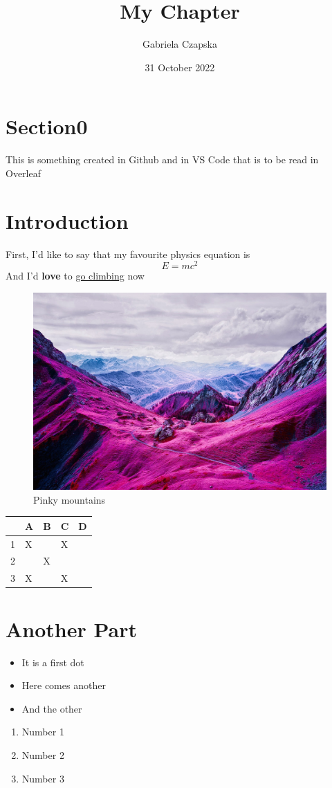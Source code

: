 \documentclass{article}
\title{My Chapter}
\author
{Gabriela Czapska}
\date{31 October 2022}
\begin{document}
\maketitle
\tableofcontents

\section{Section0}
This is something created in Github and in VS Code that is to be read in Overleaf

\section{Introduction}
First, I'd like to say that my favourite physics equation is 
\[E=mc^2\]
And I'd \textbf{love} to \underline{go climbing} now

\begin{figure}[h!]
\includegraphics[width=\linewidth]{Pictures/mountains.jpg}
\caption{Pinky mountains}
  \label{fig:mountains}
\end{figure}


\begin{table}[]
\begin{tabular}{|l|l|l|l|l|}
\hline
\rowcolor[HTML]{DAE8FC} 
                          & A & B & C & D \\ \hline
\cellcolor[HTML]{DAE8FC}1 & X &   & X &   \\ \hline
\cellcolor[HTML]{DAE8FC}2 &   & X &   &   \\ \hline
\cellcolor[HTML]{DAE8FC}3 & X &   & X &   \\ \hline
\end{tabular}
\end{table}

\section{Another Part}
\centering

\begin{itemize}
  \item It is a first dot
  \item Here comes another
  \item And the other
\end{itemize}
\begin{enumerate}
  \item Number 1
  \item Number 2
  \item Number 3
\end{enumerate}
\end{document}
